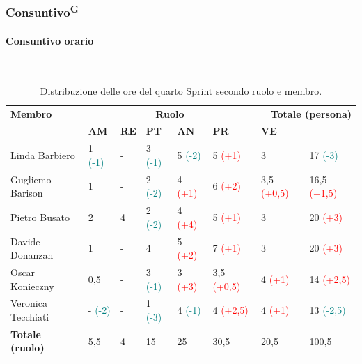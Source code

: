 \documentclass[8pt]{article}
\newcommand{\glossterm}[1]{#1\textsuperscript{G}} %
\newcommand{\subsubsubsection}[1]{\paragraph{#1}\mbox{}\\}
\begin{document}
\subsubsection{\glossterm{Consuntivo}}
\subsubsubsection{Consuntivo orario}
\begin{table}[ht!]
	\centering
	\begin{tabular}{p{3cm} p{1.4cm} p{1.6cm} p{1.7cm} p{1.4cm} p{1.4cm} p{1.5cm} p{2cm}}
		\toprule
        \textbf{Membro} & \multicolumn{5}{c}{\textbf{Ruolo}} & \multicolumn{2}{r}{\textbf{Totale (persona)}}\\
		& \textbf{AM} & \textbf{RE} & \textbf{PT} & \textbf{AN} & \textbf{PR} & \textbf{VE}\\
		\midrule
        Linda Barbiero     & 1 \textcolor{teal}{(-1)} & - & 3 \textcolor{teal}{(-1)} & 5 \textcolor{teal}{(-2)} & 5 \textcolor{red}{(+1)} & 3 & 17 \textcolor{teal}{(-3)} \\
        Gugliemo Barison   & 1 & - & 2 \textcolor{teal}{(-2)} & 4 \textcolor{red}{(+1)} & 6
        \textcolor{red}{(+2)} & 3,5 \textcolor{red}{(+0,5)} & 16,5 \textcolor{red}{(+1,5)} \\
        Pietro Busato      & 2 & 4 & 2 \textcolor{teal}{(-2)} & 4
        \textcolor{red}{(+4)} & 5 \textcolor{red}{(+1)} & 3 & 20 \textcolor{red}{(+3)} \\
        Davide Donanzan    & 1 & - & 4 & 5 \textcolor{red}{(+2)} & 7 \textcolor{red}{(+1)} & 3 & 20 \textcolor{red}{(+3)} \\
        Oscar Konieczny    & 0,5  & - & 3 \textcolor{teal}{(-1)} & 3
        \textcolor{red}{(+3)} & 3,5 \textcolor{red}{(+0,5)} & 4 \textcolor{red}{(+1)} & 14 \textcolor{red}{(+2,5)}\\
        Veronica Tecchiati & - \textcolor{teal}{(-2)} & - & 1 \textcolor{teal}{(-3)} & 4 \textcolor{teal}{(-1)} & 4 \textcolor{red}{(+2,5)} & 4 \textcolor{red}{(+1)} & 13 \textcolor{teal}{(-2,5)} \\
        \midrule
        \textbf{Totale (ruolo)} & 5,5 & 4 & 15 & 25 & 30,5 & 20,5 & 100,5 \\
		\bottomrule
	\end{tabular}
	\caption{Distribuzione delle ore del quarto Sprint secondo ruolo e membro.}
	\label{table:Distribuzione delle ore del quarto Sprint secondo ruolo e membr}
\end{table}
\end{document}
